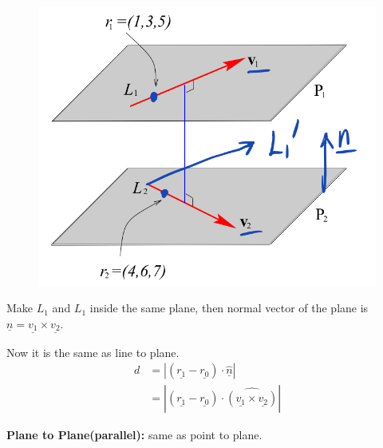 \documentclass[11pt, a4paper]{MATH2023}
\newcommand{\vct}{\underline}
\begin{document}
\begin{spacing}{1.3}
    \begin{figure}\centering
        \includegraphics[scale=0.3]{images/Ch10-dist-line-line.jpeg}
    \end{figure}
    Make $L_1$ and $L_1$ inside the same plane, then normal vector of 
    the plane is $\vct{n}=\vct{v_1}\times \vct{v_2}$.

    Now it is the same as line to plane.
    \begin{align*}
        d &= | (\vct{r_1}-\vct{r_0})\cdot \hat{\vct{n}} |\\
         &= | (\vct{r_1}-\vct{r_0})\cdot \widehat{(\vct{v_1}\times \vct{v_2})} |
    \end{align*}

    \vspace{1in}
    
    {\bf Plane to Plane(parallel):} same as point to plane. 

\end{spacing}
\end{document}
